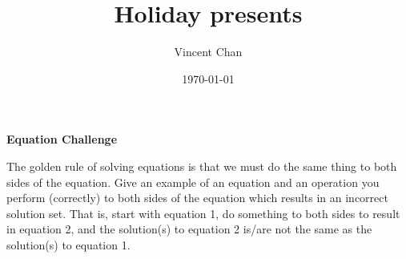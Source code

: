 \documentclass{article}
\title{Holiday presents}
\author{Vincent Chan}
\date{\today}
\begin{document}
\begin{center}
\textbf{Equation Challenge}
\end{center}

The golden rule of solving equations is that we must do the same thing to both sides of the equation. Give an example of an equation and an operation you perform (correctly) to both sides of the equation which results in an incorrect solution set. That is, start with equation 1, do something to both sides to result in equation 2, and the solution(s) to equation 2 is/are not the same as the solution(s) to equation 1.
\end{document}
